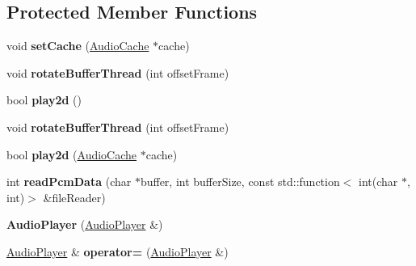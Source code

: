 \subsection*{Protected Member Functions}
\begin{DoxyCompactItemize}
\item 
\mbox{\label{classexperimental_1_1AudioPlayer_ac3f62b52b461ce6819f585abda7450a0}} 
void {\bfseries set\+Cache} (\hyperlink{classexperimental_1_1AudioCache}{Audio\+Cache} $\ast$cache)
\item 
\mbox{\label{classexperimental_1_1AudioPlayer_ae40443667d89341e376fa5241fd54bc4}} 
void {\bfseries rotate\+Buffer\+Thread} (int offset\+Frame)
\item 
\mbox{\label{classexperimental_1_1AudioPlayer_a1a99b6133772ee88475daf70b24d9ed2}} 
bool {\bfseries play2d} ()
\item 
\mbox{\label{classexperimental_1_1AudioPlayer_ae40443667d89341e376fa5241fd54bc4}} 
void {\bfseries rotate\+Buffer\+Thread} (int offset\+Frame)
\item 
\mbox{\label{classexperimental_1_1AudioPlayer_a6404068ba91351e24ddf66a48ae07cd7}} 
bool {\bfseries play2d} (\hyperlink{classexperimental_1_1AudioCache}{Audio\+Cache} $\ast$cache)
\item 
\mbox{\label{classexperimental_1_1AudioPlayer_a42a926b6dc036c4fe47c4b36a4528b84}} 
int {\bfseries read\+Pcm\+Data} (char $\ast$buffer, int buffer\+Size, const std\+::function$<$ int(char $\ast$, int)$>$ \&file\+Reader)
\item 
\mbox{\label{classexperimental_1_1AudioPlayer_a801928ba8e7a8353a9c6e0c2e6085603}} 
{\bfseries Audio\+Player} (\hyperlink{classexperimental_1_1AudioPlayer}{Audio\+Player} \&)
\item 
\mbox{\label{classexperimental_1_1AudioPlayer_a02390da2c8bf6700b2fcda7ec28462cf}} 
\hyperlink{classexperimental_1_1AudioPlayer}{Audio\+Player} \& {\bfseries operator=} (\hyperlink{classexperimental_1_1AudioPlayer}{Audio\+Player} \&)

\end{DoxyCompactItemize}
